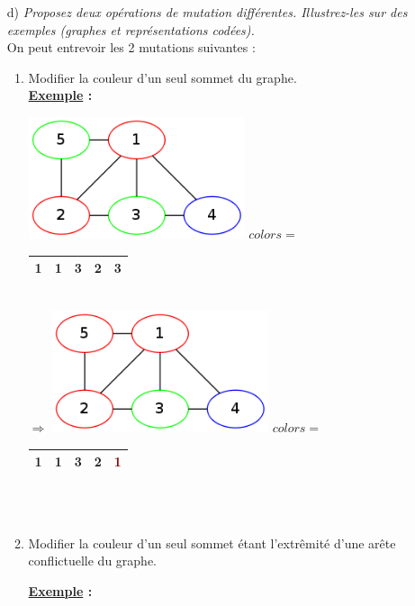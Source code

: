 \documentclass{article}
\newcommand{\dred}[1]{\textcolor{darkred}{\textbf{#1}}}
\newcommand{\term}[1]{\textit{\textcolor{maintitle}{#1}}}
\begin{document}
\begin{sffamily}
\begin{enumerate}
\item[d)] \term{Proposez deux opérations de mutation différentes. Illustrez-les sur des exemples (graphes et représentations 
codées).} \\

On peut entrevoir les 2 mutations suivantes :
\begin{enumerate}
\item Modifier la couleur d'un seul sommet du graphe. \\
\textbf{\underline{Exemple} :} 

\begin{center}
    \includegraphics[width=240px]{ex2.png}
    $colors = $
	\begin{tabular}{|c|c|c|c|c|}
	\hline
	1 & 1 & 3 & 2 & 3\\
	\hline
	\end{tabular} \\
	$\Rightarrow$
	\includegraphics[width=240px]{ex2_2.png}
    $colors = $
	\begin{tabular}{|c|c|c|c|c|}
	\hline
	1 & 1 & 3 & 2 & \dred{1}\\
	\hline
	\end{tabular}  \\$ $\\
\end{center}
\item Modifier la couleur d'un seul sommet étant l'extrêmité d'une arête conflictuelle du graphe.

\textbf{\underline{Exemple} :} 


\end{enumerate}
\end{enumerate}
\end{sffamily}
\end{document}
